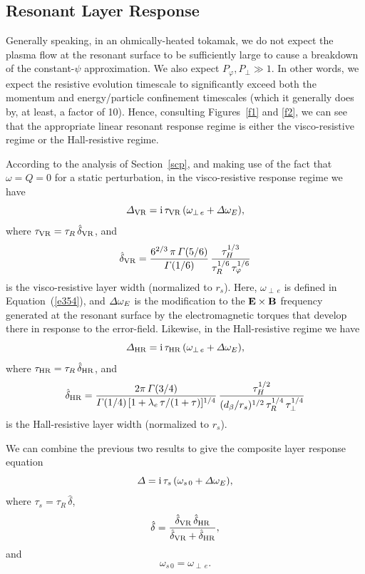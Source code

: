 \documentclass[notitlepage,12pt]{article}
\begin{document}
\subsection{Resonant Layer Response}
Generally speaking, in an ohmically-heated tokamak, we do not expect the plasma flow at the resonant surface to be sufficiently
large to cause a breakdown of the constant-$\psi$ approximation. We also expect $P_\varphi, P_\perp \gg 1$. In other
words, we expect the resistive evolution timescale to significantly exceed both the momentum and energy/particle
confinement timescales (which it generally does by, at least, a factor of 10). Hence, consulting Figures~\ref{f1} and \ref{f2},
we can see that the appropriate linear resonant response regime is either the visco-resistive regime or the Hall-resistive
regime. 

According to the analysis of Section~\ref{scp}, and making use of the fact that $\omega=Q=0$ for a static perturbation, 
in the visco-resistive response regime we have
\begin{equation}
{\mit\Delta}_{\rm VR} = {\rm i}\,\tau_{\rm VR}\,(\omega_{\perp\,e}+{\mit\Delta}\omega_E),
\end{equation}
where $\tau_{\rm VR} = \tau_R\,\hat{\delta}_{\rm VR}$, and
\begin{equation}
\hat{\delta}_{\rm VR} = \frac{6^{2/3}\,\pi\,{\mit\Gamma}(5/6)}{{\mit\Gamma}(1/6)}\,\frac{\tau_H^{1/3}}{\tau_R^{1/6}\,\tau_\varphi^{1/6}}
\end{equation}
is the visco-resistive layer width (normalized to $r_s$). Here, $\omega_{\perp\,e}$ is defined in Equation~(\ref{e354}), and
${\mit\Delta}\omega_E$ is the modification to the ${\bf E}\times{\bf B}$ frequency generated at the resonant surface by
the electromagnetic torques that develop there in response to the error-field. Likewise, in the
Hall-resistive regime we have
\begin{equation}
{\mit\Delta}_{\rm HR} = {\rm i}\,\tau_{\rm HR}\,(\omega_{\perp\,e}+{\mit\Delta}\omega_E),
\end{equation}
where $\tau_{\rm HR} = \tau_R\,\hat{\delta}_{\rm HR}$, and
\begin{equation}
\hat{\delta}_{\rm HR} = \frac{2\pi\,{\mit\Gamma}(3/4)}{{\mit\Gamma}(1/4)\,[1+\lambda_e\,\tau/(1+\tau)]^{1/4}}\,
\frac{\tau_H^{1/2}}{(d_\beta/r_s)^{1/2}\,\tau_R^{1/4}\,\tau_\perp^{1/4}}
\end{equation}
is the Hall-resistive layer width (normalized to $r_s$).

We can combine the previous two results to give the composite layer response equation
\begin{equation}\label{e389}
{\mit\Delta} = {\rm i}\,\tau_s\,(\omega_{s\,0}+ {\mit\Delta}\omega_E),
\end{equation}
where $\tau_s=\tau_R\,\hat{\delta}$, 
\begin{equation}
\hat{\delta} = \frac{\hat{\delta}_{\rm VR}\,\hat{\delta}_{\rm HR}}{\hat{\delta}_{\rm VR} + \hat{\delta}_{\rm HR}},
\end{equation}
and 
\begin{equation}
\omega_{s\,0}= \omega_{\perp\,e}.
\end{equation} 
\end{document}
